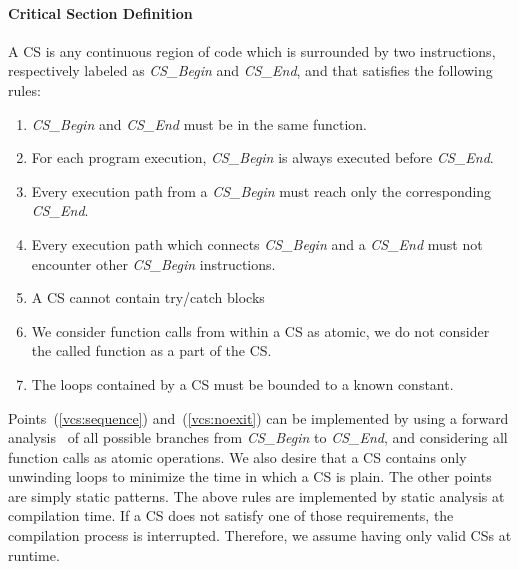 \paragraph{\textbf{Critical Section Definition}}
A CS is any continuous region of code which is surrounded by two instructions, 
respectively labeled as \emph{CS\_Begin} and \emph{CS\_End}, and that satisfies 
the following rules:

\begin{enumerate}
	\item\label{vcs:function} \emph{CS\_Begin} and \emph{CS\_End} must be in 
	the same function.
	\item\label{vcs:sequence} For each program execution, \emph{CS\_Begin} is 
	always executed before \emph{CS\_End}.
	\item\label{vcs:noexit} Every execution path from a \emph{CS\_Begin} must 
	reach only the corresponding \emph{CS\_End}.
	\item\label{vcs:nooverlap} Every execution path which connects 
	\emph{CS\_Begin} and a \emph{CS\_End} must not encounter other 
	\emph{CS\_Begin} instructions.
	\item A CS cannot contain try/catch blocks
	\item We consider function calls from within a CS as atomic,	\ie we do 
	not consider the called function as a part of the CS.
	\item\label{vcs:loops} The loops contained by a CS must be bounded to a 
	known constant.
\end{enumerate}
Points~(\ref{vcs:sequence}) and~(\ref{vcs:noexit}) can be implemented by using 
a forward analysis~\cite{moller2012static} of all possible branches from 
\emph{CS\_Begin} to \emph{CS\_End}, and considering all function calls as 
atomic operations.
We also desire that a CS contains only unwinding loops to minimize the time in 
which a CS is plain.
The other points are simply static patterns.
The above rules are implemented by static analysis at compilation time.
If a CS does not satisfy one of those requirements, the compilation process is 
interrupted.
Therefore, we assume having only valid CSs at runtime.

